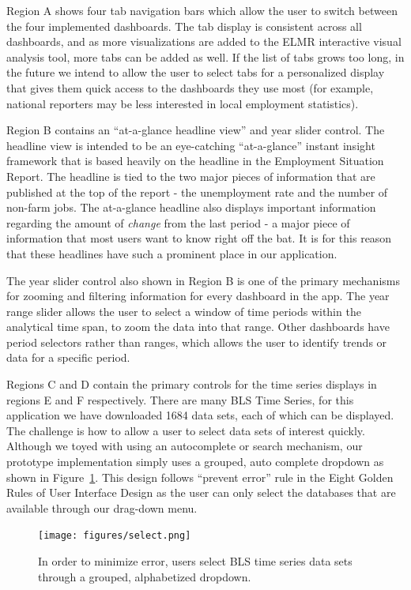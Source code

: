 \documentclass{sigchi}
\begin{document}
Region A shows four tab navigation bars which allow the user to switch between the four implemented dashboards. The tab display is consistent across all dashboards, and as more visualizations are added to the ELMR interactive visual analysis tool, more tabs can be added as well. If the list of tabs grows too long, in the future we intend to allow the user to select tabs for a personalized display that gives them quick access to the dashboards they use most (for example, national reporters may be less interested in local employment statistics).

Region B contains an ``at-a-glance headline view'' and year slider control. The headline view is intended to be an eye-catching ``at-a-glance'' instant insight framework that is based heavily on the headline in the Employment Situation Report. The headline is tied to the two major pieces of information that are published at the top of the report - the unemployment rate and the number of non-farm jobs. The at-a-glance headline also displays important information regarding the amount of \textit{change} from the last period - a major piece of information that most users want to know right off the bat. It is for this reason that these headlines have such a prominent place in our application.

The year slider control also shown in Region B is one of the primary mechanisms for zooming and filtering information for every dashboard in the app. The year range slider allows the user to select a window of time periods within the analytical time span, to zoom the data into that range. Other dashboards have period selectors rather than ranges, which allows the user to identify trends or data for a specific period.

Regions C and D contain the primary controls for the time series displays in regions E and F respectively. There are many BLS Time Series, for this application we have downloaded 1684 data sets, each of which can be displayed. The challenge is how to allow a user to select data sets of interest quickly. Although we toyed with using an autocomplete or search mechanism, our prototype implementation simply uses a grouped, auto complete dropdown as shown in Figure~\ref{fig:select}. This design follows ``prevent error'' rule in the Eight Golden Rules of User Interface Design \cite{shneiderman_eight_????} as the user can only select the databases that are available through our drag-down menu.

\begin{figure}[h]
    \centering
    \texttt{[image: figures/select.png]}
    \caption{In order to minimize error, users select BLS time series data sets through a grouped, alphabetized dropdown.}
    \label{fig:select}
\end{figure}
\end{document}
